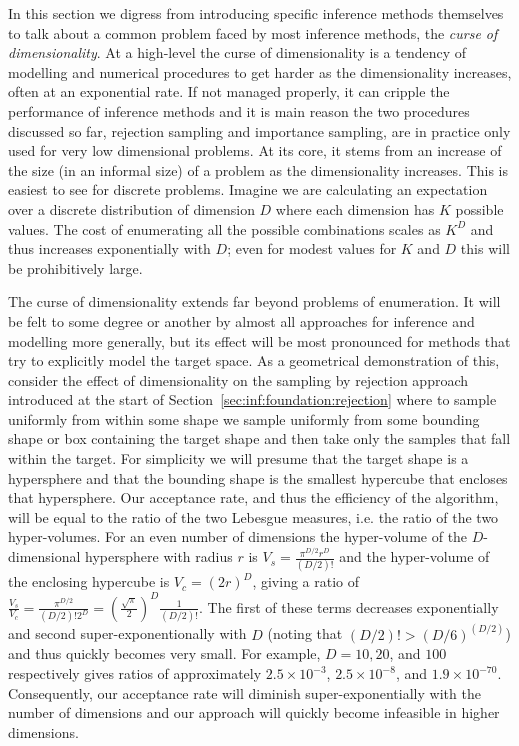 
In this section we digress from introducing specific inference methods themselves
to talk about a common problem faced by most inference methods, the
\emph{curse of dimensionality}.  At a high-level the curse of dimensionality is a tendency
of modelling and numerical procedures to get harder as the dimensionality increases, 
often at an exponential rate.  If not managed properly, it can cripple the performance of
inference methods and it is main reason the two procedures discussed so far, rejection
sampling and importance sampling, are in practice only used for very low dimensional problems.
At its core, it stems from an increase of the size (in an informal size) of a problem as the
dimensionality increases.  This is easiest to see for discrete problems.   Imagine we are calculating
an expectation over a discrete distribution of dimension $D$ where each dimension has $K$
possible values.  The cost of enumerating all the possible combinations scales as $K^D$ and thus
increases exponentially with $D$; even for modest values for $K$ and $D$ this will 
be prohibitively large.

The curse of dimensionality extends far beyond problems of enumeration.  It will be felt to
some degree or another by almost all approaches for inference and modelling more generally,
but its effect will be most pronounced for methods that try to explicitly model the target
space.  As a geometrical demonstration of this, consider the effect of dimensionality on 
the sampling by rejection approach introduced at the start of Section~\ref{sec:inf:foundation:rejection} where to
sample uniformly from within some shape we sample uniformly from
some bounding shape or box containing the target shape and then take only the samples
that fall within the target.  For simplicity we will presume that the target shape is a hypersphere and that
the bounding shape is the smallest hypercube that encloses that hypersphere.  Our acceptance rate,
and thus the efficiency of the algorithm, will be equal to the ratio of the two Lebesgue 
measures, i.e. the ratio of the two hyper-volumes.  
For an even number of dimensions
the hyper-volume of the $D$-dimensional hypersphere with radius $r$ is $V_{s} = \frac{\pi^{D/2}r^D}{(D/2)!}$
and the hyper-volume of the enclosing hypercube is $V_c = (2r)^D$, giving a ratio of
$\frac{V_s}{V_c} = \frac{\pi^{D/2}}{(D/2)! 2^D} = \left(\frac{\sqrt{\pi}}{2}\right)^D\frac{1}{(D/2)!}$.
The first of these terms decreases exponentially and second
super-exponentionally with $D$ (noting that $(D/2)!>(D/6)^{(D/2)}$) and thus quickly becomes
very small.  For example, $D=10, 20$, and $100$ respectively gives ratios of approximately
$2.5 \times 10^{-3}$, $2.5 \times 10^{-8}$, and $1.9\times 10^{-70}$.  
Consequently, our acceptance rate will diminish
super-exponentially with the number of dimensions and our approach will quickly become
infeasible in higher dimensions.

